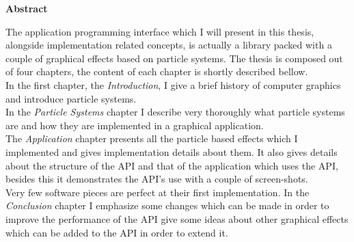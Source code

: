 \thispagestyle{plain}

\begin{center}
	\textbf{Abstract}
\end{center}

The application programming interface which I will present in this thesis, alongside implementation related concepts, is actually a library packed with a couple of graphical effects based on particle systems. The thesis is composed out of four chapters, the content of each chapter is shortly described bellow.\\

In the first chapter, the \textit{Introduction}, I give a brief history of computer graphics and introduce particle systems.\\

In the \textit{Particle Systems} chapter I describe very thoroughly what particle systems are and how they are implemented in a graphical application.\\

The \textit{Application} chapter presents all the particle based effects which I implemented and gives implementation details about them. It also gives details about the structure of the API and that of the application which uses the API, besides this it demonstrates the API's use with a couple of screen-shots.\\

Very few software pieces are perfect at their first implementation. In the \textit{Conclusion} chapter I emphasize some changes which can be made in order to improve the performance of the API give some ideas about other graphical effects which can be added to the API in order to extend it.
